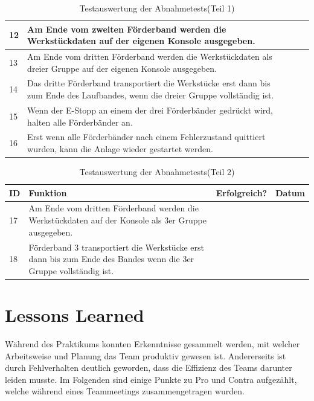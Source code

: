 \documentclass[a4paper, 11pt]{article}
\begin{document}
\begin{table}[H]
\begin{tabularx}{\textwidth}{|l|X|l|l|}
        12&Am Ende vom zweiten Förderband werden die Werkstückdaten auf der eigenen Konsole ausgegeben.&&\\
        \hline
        13&Am Ende vom dritten Förderband werden die Werkstückdaten als dreier Gruppe auf der eigenen
        Konsole ausgegeben.&&\\
        \hline
        14&Das dritte Förderband transportiert die Werkstücke erst dann bis zum Ende des Laufbandes, wenn 
        die dreier Gruppe vollständig ist.&&\\
        \hline
        15&Wenn der E-Stopp an einem der drei Förderbänder gedrückt wird, halten alle Förderbänder an.&&\\
        \hline
        16&Erst wenn alle Förderbänder nach einem Fehlerzustand quittiert wurden, kann die Anlage wieder 
        gestartet werden.&&\\
        \hline
    \end{tabularx}
    \caption{Testauswertung der Abnahmetests(Teil 1)}
    \label{tstl1}
\end{table}

\newpage

\begin{table}[H]
\center
    \begin{tabularx}{\textwidth}{|l|X|l|l|}
        \hline
        \textbf{ID}&\textbf{Funktion}&\textbf{Erfolgreich?}&\textbf{Datum}\\
        \hline

        17&Am Ende vom dritten Förderband werden die Werkstückdaten auf der Konsole als 3er Gruppe ausgegeben.&&\\
        \hline
        18&Förderband 3 transportiert die Werkstücke erst dann bis zum Ende des Bandes wenn die 3er Gruppe vollständig ist.&&\\
        \hline
        \end{tabularx}
    \caption{Testauswertung der Abnahmetests(Teil 2)}
    \label{tstl2}
\end{table}

\section{Lessons Learned}
Während des Praktikums konnten Erkenntnisse gesammelt werden, mit welcher Arbeitsweise und Planung das Team produktiv gewesen ist. Andererseits ist durch Fehlverhalten deutlich geworden, dass die Effizienz des Teams darunter leiden musste. Im Folgenden sind einige Punkte zu Pro und Contra aufgezählt, welche während eines Teammeetings zusammengetragen wurden.
\end{document}
